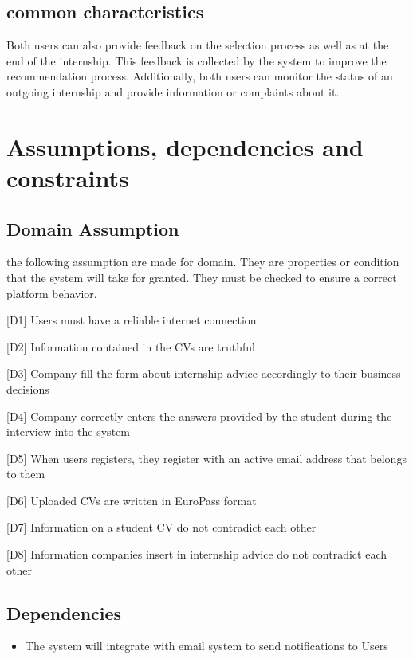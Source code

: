		\subsection{common characteristics}
			Both users can also provide feedback on the selection process as well as at the end of the internship. This feedback is collected by the system to improve the recommendation process. Additionally, both users can monitor the status of an outgoing internship and provide information or complaints about it.
		
	\section{Assumptions, dependencies and constraints}
		\subsection{Domain Assumption}
			the following assumption are made for domain. They are properties or condition that the system will take for granted. They must be checked to ensure a correct platform behavior.
			
			[D1] Users must have a reliable internet connection
			
			[D2] Information contained in the CVs are truthful
			
			[D3] Company fill the form about internship advice accordingly to their business decisions
			
			[D4] Company correctly enters the answers provided by the student during the interview into the system
			
			[D5] When users registers, they register with an active email address that belongs to them
			
			[D6] Uploaded CVs are written in EuroPass format
			
			[D7] Information on a student CV do not contradict each other
			
			[D8] Information companies insert in internship advice do not contradict each other
			
		\subsection{Dependencies}
			\begin{itemize}
				\item The system will integrate with email system to send notifications to Users
			\end{itemize}
		
